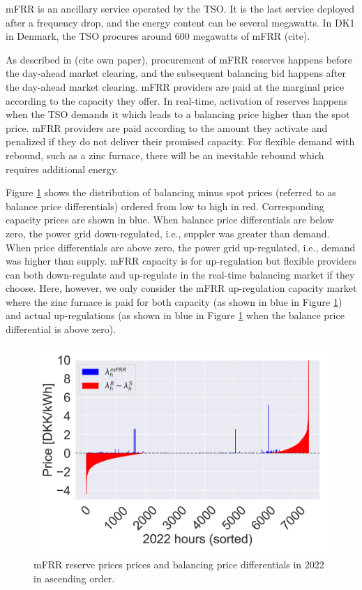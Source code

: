 \documentclass[lettersize,journal]{IEEEtran}
\begin{document}
mFRR is an ancillary service operated by the TSO. It is the last service deployed after a frequency drop, and the energy content can be several megawatts. In DK1 in Denmark, the TSO procures around 600 megawatts of mFRR (cite).

As described in (cite own paper), procurement of mFRR reserves happens before the day-ahead market clearing, and the subsequent balancing bid happens after the day-ahead market clearing. mFRR providers are paid at the marginal price according to the capacity they offer. In real-time, activation of reserves happens when the TSO demands it which leads to a balancing price higher than the spot price. mFRR providers are paid according to the amount they activate and penalized if they do not deliver their promised capacity. For flexible demand with rebound, such as a zinc furnace, there will be an inevitable rebound which requires additional energy.

Figure \ref{fig:mfrr_prices_2022} shows the distribution of balancing minus spot prices (referred to as balance price differentials) ordered from low to high in red. Corresponding capacity prices are shown in blue. When balance price differentials are below zero, the power grid down-regulated, i.e., suppler was greater than demand. When price differentials are above zero, the power grid up-regulated, i.e., demand was higher than supply. mFRR capacity is for up-regulation but flexible providers can both down-regulate and up-regulate in the real-time balancing market if they choose. Here, however, we only consider the mFRR up-regulation capacity market where the zinc furnace is paid for both capacity (as shown in blue in Figure \ref{fig:mfrr_prices_2022}) and actual up-regulations (as shown in blue in Figure \ref{fig:mfrr_prices_2022} when the balance price differential is above zero).

\begin{figure}[!t]
    \centering
    \includegraphics[width=\columnwidth]{figures/mfrr_prices.png}
    \caption{mFRR reserve prices prices and balancing price differentials in 2022 in ascending order.}
    \label{fig:mfrr_prices_2022}
\end{figure}
\end{document}
